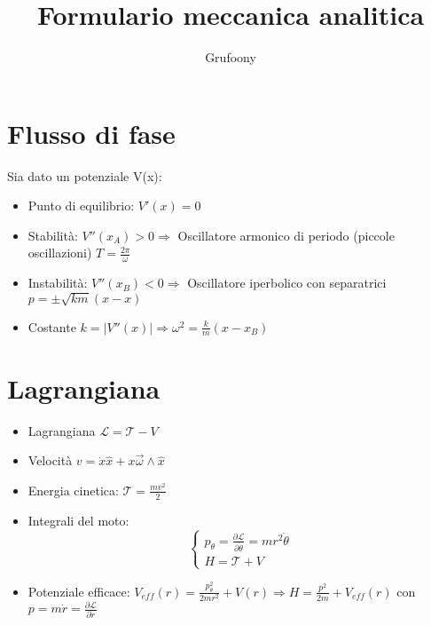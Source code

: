 \documentclass[a4paper]{article}
\begin{document}
	\title{Formulario meccanica analitica}
	\author{Grufoony}
    \maketitle
    \section{Flusso di fase}
        Sia dato un potenziale V(x):
        \begin{itemize}
            \item Punto di equilibrio: $V'(x)=0$
            \item Stabilità: $V''(x_A)>0 \Rightarrow$ Oscillatore armonico di periodo (piccole oscillazioni) $T=\frac{2\pi}{\omega}$
            \item Instabilità: $V''(x_B)<0 \Rightarrow$ Oscillatore iperbolico con separatrici $p=\pm\sqrt{km}(x-x)$
            \item Costante $k=\lvert V''(x) \rvert \Rightarrow \omega^2=\frac{k}{m}(x-x_B)$
        \end{itemize}
    \section{Lagrangiana}
        \begin{itemize}
            \item Lagrangiana $\mathcal{L}=\mathcal{T}-V$
            \item Velocità $v=\dot{x}\hat{x}+x\vec{\omega}\wedge\hat{x}$
            \item Energia cinetica: $\mathcal{T}=\frac{mv^2}{2}$
            \item Integrali del moto:
                \begin{equation}
                    \begin{cases}
                    p_\theta=\frac{\partial{\mathcal{L}}}{\partial{\dot{\theta}}}=mr^2\dot{\theta}\\
                    H=\mathcal{T}+V
                    \end{cases}
                \end{equation}
            \item Potenziale efficace: $V_{eff}(r)=\frac{p_\theta^2}{2mr^2}+V(r) \Rightarrow H=\frac{p^2}{2m}+V_{eff}(r)$ con $p=m\dot{r}=\frac{\partial{\mathcal{L}}}{\partial{\dot{r}}}$
        \end{itemize}
\end{document}
